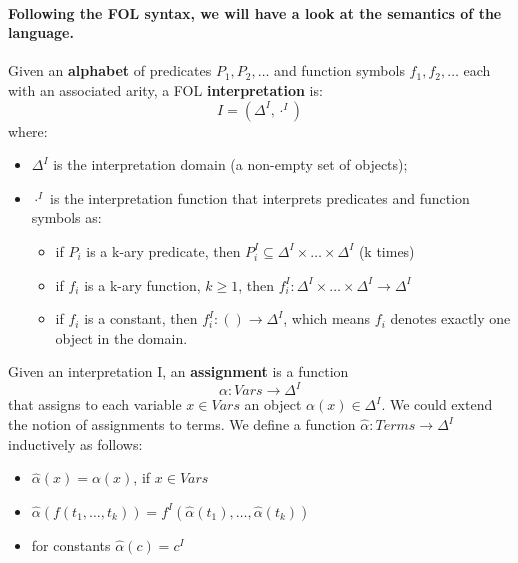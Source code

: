 \paragraph*{\textnormal{Following the FOL syntax, we will have a look at the semantics of the language.}}
\begin{defs}
	Given an \textbf{alphabet} of predicates $P_{1},P_{2},\dots$ and function symbols $f_{1},f_{2},\ldots$ each with an associated arity, a FOL \textbf{interpretation} is:
	\begin{equation*}
	I = (\Delta^{I},\cdot^{I})
	\end{equation*}
	where:
	\begin{itemize}
		\item $\Delta^{I}$ is the interpretation domain (a non-empty set of objects);
		\item $\cdot^{I}$ is the interpretation function that interprets predicates and function symbols as:
		\begin{itemize}
			\item if $P_{i}$ is a k-ary predicate, then $P_{i}^{I} \subseteq \Delta^{I} \times \ldots \times \Delta^{I}$ (k times)
			\item if $f_{i}$ is a k-ary function, $k \geq 1$, then $f_{i}^{I} : \Delta^{I} \times \ldots \times \Delta^{I} \rightarrow \Delta^{I}$
			\item if $f_{i}$ is a constant, then $f_{i}^{I} : () \rightarrow \Delta^{I}$, which means $f_{i}$ denotes exactly one object in the domain.
		\end{itemize} 
	\end{itemize}
\end{defs}

\begin{defs}
	Given an interpretation I, an \textbf{assignment} is a function
	\begin{equation*}
	\alpha : Vars \rightarrow \Delta^{I}
	\end{equation*}
	that assigns to each variable $x \in Vars$ an object $\alpha(x) \in \Delta^{I}$. We could extend the notion of assignments to terms. We define a function $\hat{\alpha} : Terms \rightarrow \Delta^{I}$ inductively as follows:
	\begin{itemize}
		\item $\hat{\alpha}(x) = \alpha (x)$, if $x \in Vars$
		\item $\hat{\alpha}(f(t_{1},\ldots,t_{k})) = f^{I}(\hat{\alpha}(t_{1}),\ldots,\hat{\alpha}(t_{k}))$
		\item for constants $\hat{\alpha}(c) = c^{I}$
	\end{itemize}
\end{defs}

